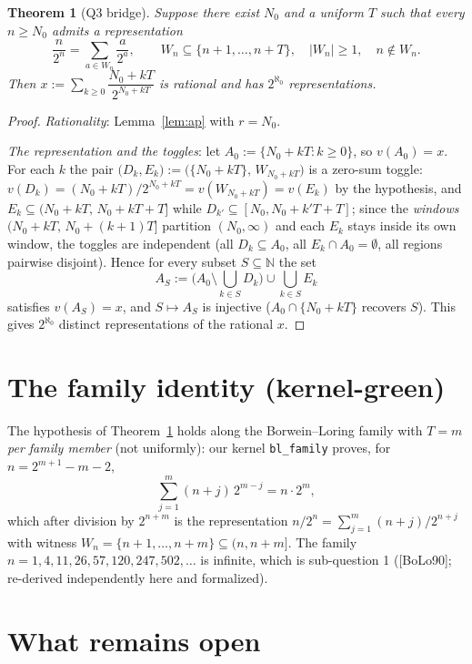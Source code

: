 \documentclass{article}
\newtheorem{theorem}{Theorem}
\begin{document}
\begin{theorem}[Q3 bridge]\label{thm:bridge}
Suppose there exist $N_0$ and a uniform $T$ such that \emph{every}
$n \ge N_0$ admits a representation
\[ \frac{n}{2^n} = \sum_{a \in W_n} \frac{a}{2^a}, \qquad
   W_n \subseteq \{n+1, \ldots, n+T\}, \quad |W_n| \ge 1, \quad n \notin W_n . \]
Then $x := \sum_{k \ge 0} \dfrac{N_0 + kT}{2^{N_0+kT}}$ is rational and has
$2^{\aleph_0}$ representations.
\end{theorem}
\begin{proof}
\emph{Rationality}: Lemma~\ref{lem:ap} with $r = N_0$.

\emph{The representation and the toggles}: let
$A_0 := \{N_0 + kT : k \ge 0\}$, so $v(A_0) = x$.  For each $k$ the pair
$\bigl(D_k, E_k\bigr) := \bigl(\{N_0+kT\},\, W_{N_0+kT}\bigr)$ is a
zero-sum toggle: $v(D_k) = (N_0+kT)/2^{N_0+kT} = v(W_{N_0+kT}) = v(E_k)$ by
the hypothesis, and $E_k \subseteq (N_0+kT,\, N_0+kT+T]$ while
$D_{k'} \subseteq [N_0, N_0+k'T+T]$; since the \emph{windows}
$(N_0+kT,\, N_0+(k+1)T]$ partition $(N_0, \infty)$ and each $E_k$ stays
inside its own window, the toggles are independent (all $D_k \subseteq A_0$,
all $E_k \cap A_0 = \emptyset$, all regions pairwise disjoint).  Hence for
every subset $S \subseteq \mathbb{N}$ the set
\[ A_S := \bigl(A_0 \setminus \bigcup_{k \in S} D_k\bigr) \cup
   \bigcup_{k \in S} E_k \]
satisfies $v(A_S) = x$, and $S \mapsto A_S$ is injective ($A_0 \cap
\{N_0+kT\}$ recovers $S$).  This gives $2^{\aleph_0}$ distinct
representations of the rational $x$.
\end{proof}

\section{The family identity (kernel-green)}

The hypothesis of Theorem~\ref{thm:bridge} holds along the Borwein--Loring
family with $T = m$ \emph{per family member} (not uniformly): our kernel
\texttt{bl\_family} proves, for $n = 2^{m+1} - m - 2$,
\[ \sum_{j=1}^{m} (n+j)\,2^{m-j} = n \cdot 2^m, \]
which after division by $2^{n+m}$ is the representation
$n/2^n = \sum_{j=1}^m (n+j)/2^{n+j}$ with witness $W_n = \{n+1, \ldots,
n+m\} \subseteq (n, n+m]$.  The family $n = 1, 4, 11, 26, 57, 120, 247,
502, \ldots$ is infinite, which is sub-question 1 ([BoLo90]; re-derived
independently here and formalized).

\section{What remains open}
\end{document}
